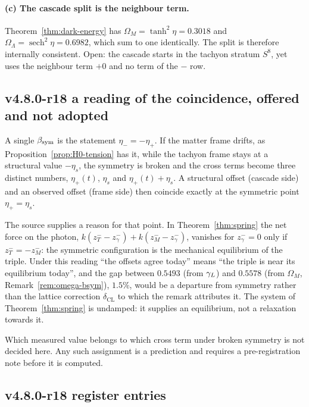 \paragraph{(c) The cascade split is the neighbour term.}
Theorem~\ref{thm:dark-energy} has \(\Omega_M=\tanh^2\eta=0.3018\) and \(\Omega_\Lambda=\operatorname{sech}^2\eta=0.6982\),
which sum to one identically.  The split is therefore internally consistent.  Open: the cascade starts in the
tachyon stratum \(S^8\), yet uses the neighbour term \(+0\) and no term of the \(-\) row.

\subsection*{v4.8.0-r18 a reading of the coincidence, offered and not adopted}
\label{subsec:v480-r18-reading}

A single \(\beta_{\mathrm{sym}}\) is the statement \(\eta_-=-\eta_+\).  If the matter frame drifts, as
Proposition~\ref{prop:H0-tension} has it, while the tachyon frame stays at a structural value \(-\eta_s\), the symmetry
is broken and the cross terms become three distinct numbers, \(\eta_+(t)\), \(\eta_s\) and \(\eta_+(t)+\eta_s\).
A structural offset (cascade side) and an observed offset (frame side) then coincide exactly at the symmetric point
\(\eta_+=\eta_s\).

The source supplies a reason for that point.  In Theorem~\ref{thm:spring} the net force on the photon,
\(k(z^-_T-z^-_\gamma)+k(z^-_M-z^-_\gamma)\), vanishes for \(z^-_\gamma=0\) only if \(z^-_T=-z^-_M\): the symmetric
configuration is the mechanical equilibrium of the triple.  Under this reading ``the offsets agree today'' means
``the triple is near its equilibrium today'', and the gap between \(0.5493\) (from \(\gamma_L\)) and \(0.5578\) (from
\(\Omega_M\), Remark~\ref{rem:omega-bsym}), \(1.5\%\), would be a departure from symmetry rather than the lattice
correction \(\delta_{\mathrm{CL}}\) to which the remark attributes it.  The system of Theorem~\ref{thm:spring} is
undamped: it supplies an equilibrium, not a relaxation towards it.

Which measured value belongs to which cross term under broken symmetry is not decided here.  Any such assignment is a
prediction and requires a pre-registration note before it is computed.

\subsection*{v4.8.0-r18 register entries}
\label{subsec:v480-r18-register}

